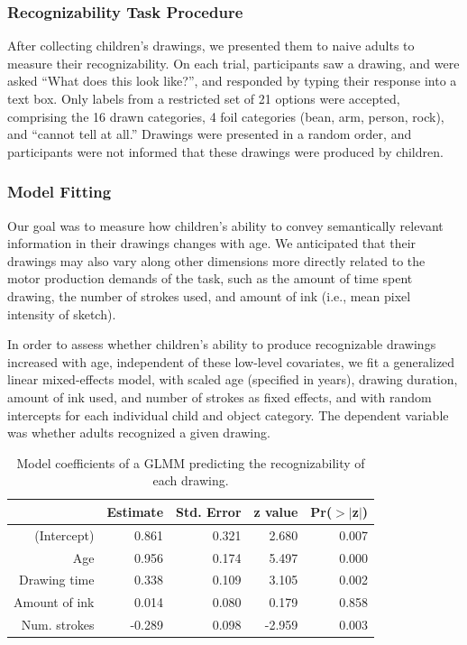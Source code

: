 \documentclass[10pt, letterpaper]{article}
\begin{document}
\subsubsection{Recognizability Task
Procedure}\label{recognizability-task-procedure}

After collecting children's drawings, we presented them to naive adults
to measure their recognizability. On each trial, participants saw a
drawing, and were asked ``What does this look like?'', and responded by
typing their response into a text box. Only labels from a restricted set
of 21 options were accepted, comprising the 16 drawn categories, 4 foil
categories (bean, arm, person, rock), and ``cannot tell at all.''
Drawings were presented in a random order, and participants were not
informed that these drawings were produced by children.

\subsubsection{Model Fitting}\label{model-fitting}

Our goal was to measure how children's ability to convey semantically
relevant information in their drawings changes with age. We anticipated
that their drawings may also vary along other dimensions more directly
related to the motor production demands of the task, such as the amount
of time spent drawing, the number of strokes used, and amount of ink
(i.e., mean pixel intensity of sketch).

In order to assess whether children's ability to produce recognizable
drawings increased with age, independent of these low-level covariates,
we fit a generalized linear mixed-effects model, with scaled age
(specified in years), drawing duration, amount of ink used, and number
of strokes as fixed effects, and with random intercepts for each
individual child and object category. The dependent variable was whether
adults recognized a given drawing.

\begin{table}[H]
\centering
\begin{tabular}{rrrrr}
  \hline
 & Estimate & Std. Error & z value & Pr($>$$|$z$|$) \\
  \hline
(Intercept) & 0.861 & 0.321 & 2.680 & 0.007 \\
  Age & 0.956 & 0.174 & 5.497 & 0.000 \\
  Drawing time & 0.338 & 0.109 & 3.105 & 0.002 \\
  Amount of ink & 0.014 & 0.080 & 0.179 & 0.858 \\
  Num. strokes & -0.289 & 0.098 & -2.959 & 0.003 \\
   \hline
\end{tabular}
\caption{Model coefficients of a GLMM predicting the recognizability of each drawing.}
\end{table}
\end{document}
